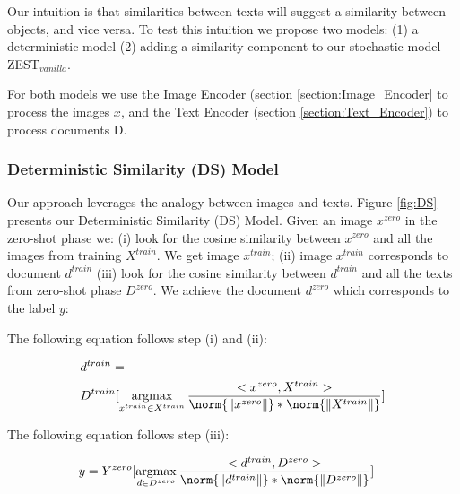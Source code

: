 \documentclass[11pt,a4paper]{article}
\begin{document}
\par

Our intuition is that similarities between texts will suggest a similarity between objects, and vice versa. To test this intuition we propose two models: (1) a deterministic model (2) adding a similarity component to our stochastic model ZEST$_{vanilla}$.

For both models we use the Image Encoder (section \ref{section:Image_Encoder} to process the images $x$, and the Text Encoder (section \ref{section:Text_Encoder}) to process documents D.

\subsubsection{Deterministic Similarity (DS) Model}

Our approach leverages the analogy between images and texts. Figure \ref{fig:DS} presents our Deterministic Similarity (DS) Model. Given an image $x^{zero}$ in the zero-shot phase we: (i) look for the cosine similarity between $x^{zero}$ and all the images from training $X^{train}$. We get image $x^{train}$; (ii) image $x^{train}$ corresponds to document $d^{train}$ (iii)
look for the cosine similarity between $d^{train}$ and all the texts from zero-shot phase $D^{zero}$. We achieve the document $d^{zero}$ which corresponds to the label $y$:


The following equation follows step (i) and (ii):

\begin{equation}
\begin{aligned}
\begin{split}
&d^{train}= \\
&D^{train}[
\operatorname*{argmax}_{x^{train}\in X^{train} } \frac{<x^{zero},X^{train}>}{\norm{\| x^{zero}\| }*\norm{\| X^{train}\| }}]
\end{split}

\end{aligned}
\end{equation}

The following equation follows step (iii):

\begin{equation}
\begin{aligned}
\begin{split}
&y=Y^{zero}[
\operatorname*{argmax}_{d\in D^{zero}} \frac{<d^{train},D^{zero}>}{\norm{\| d^{train}\| }*\norm{\| D^{zero}\| }}]
\end{split}

\end{aligned}
\end{equation}
\end{document}
